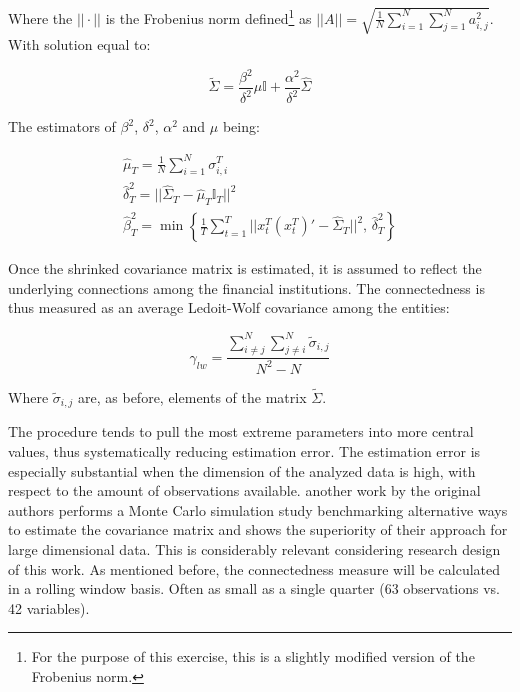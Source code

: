 \documentclass[12pt]{article}
\begin{document}
Where the $||\cdot||$ is the Frobenius norm defined\footnote{For the purpose of this exercise, this is a slightly modified version of the Frobenius norm.} as $||A|| = \sqrt{\frac{1}{N} \sum_{i=1}^{N} \sum_{j=1}^{N} a_{i,j}^2}$. With solution equal to:

\begin{equation}
	\tilde{\Sigma} = \frac{\beta^2}{\delta^2} \mu \mathbb{I} + \frac{\alpha^2}{\delta^2} \hat{\Sigma}
\end{equation}

The estimators of $\beta^2$, $\delta^2$, $\alpha^2$ and $\mu$ being:

\begin{equation}
	\begin{aligned}
	\hat{\mu}_T = \frac{1}{N} \sum_{i=1}^{N} \sigma^T_{i,i} \\
	\hat{\delta}^2_T = ||\hat{\Sigma}_T - \hat{\mu}_T \mathbb{I}_T ||^2 \\
	\hat{\beta}^2_T = \min \left\{ \frac{1}{T} \sum_{t=1}^T || x_t^T (x_t^T)' - \hat{\Sigma}_T||^2,\, \hat{\delta}^2_T \right\}
	\end{aligned}
\end{equation}

Once the shrinked covariance matrix is estimated, it is assumed to reflect the underlying connections among the financial institutions. The connectedness is thus measured as an average Ledoit-Wolf covariance among the entities:

\begin{equation}
	\gamma_{lw} = \frac{\sum_{i \neq j}^{N} \sum_{j \neq i}^N \tilde{\sigma}_{i,j}}{N^2 - N}
\end{equation}

Where $\tilde{\sigma}_{i,j}$ are, as before, elements of the matrix $\tilde{\Sigma}$.

The procedure tends to pull the most extreme parameters into more central values, thus systematically reducing estimation error. The estimation error is especially substantial when the dimension of the analyzed data is high, with respect to the amount of observations available. another work by the original authors \cite{ledoit04} performs a Monte Carlo simulation study benchmarking alternative ways to estimate the covariance matrix and shows the superiority of their approach for large dimensional data. This is considerably relevant considering research design of this work. As mentioned before, the connectedness measure will be calculated in a rolling window basis. Often as small as a single quarter (63 observations vs. 42 variables). 
\end{document}
